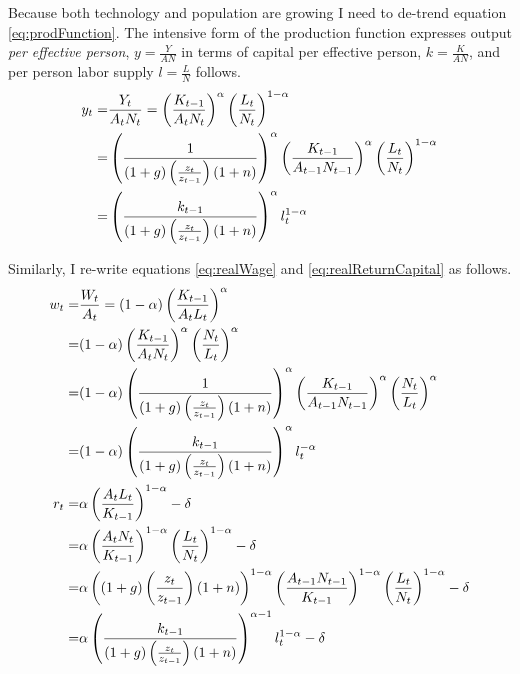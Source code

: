 \documentclass[11pt]{article}
\begin{document}
Because both technology and population are growing I need to de-trend equation \ref{eq:prodFunction}.  The intensive form of the production function expresses output \textit{per effective person}, $y=\frac{Y}{AN}$ in terms of capital per effective person, $k=\frac{K}{AN}$, and per person labor supply $l=\frac{L}{N}$ follows.
	\begin{align}
	         y_t =& \frac{Y_t}{A_t N_t} = \left(\frac{K_{t-1}}{A_t N_t}\right)^{\alpha}\left(\frac{L_{t}}{N_t}\right)^{1-\alpha} \notag \\
	         =&\left(\frac{1}{(1 + g)\left(\frac{z_t}{z_{t-1}}\right)(1 + n)}\right)^{\alpha}\left(\frac{K_{t-1}}{A_{t-1}N_{t-1}}\right)^\alpha \left(\frac{L_{t}}{N_{t}}\right)^{1-\alpha} \notag \\
	         =& \left(\frac{k_{t-1}}{(1 + g)\left(\frac{z_t}{z_{t-1}}\right)(1 + n)}\right)^{\alpha}l_t^{1 - \alpha}
	 \end{align}

Similarly, I re-write equations \ref{eq:realWage} and \ref{eq:realReturnCapital} as follows.
	\begin{align}
		w_{t} =& \frac{W_{t}}{A_{t}} = (1-\alpha)\left(\frac{K_{t-1}}{A_{t}L_{t}}\right)^\alpha \notag \\
		=& (1-\alpha)\left(\frac{K_{t-1}}{A_{t}N_{t}}\right)^\alpha \left(\frac{N_{t}}{L_{t}}\right)^{\alpha} \notag \\
		=& (1-\alpha)\left(\frac{1}{(1 + g)\left(\frac{z_t}{z_{t-1}}\right)(1 + n)}\right)^{\alpha}\left(\frac{K_{t-1}}{A_{t-1}N_{t-1}}\right)^\alpha \left(\frac{N_{t}}{L_{t}}\right)^{\alpha} \notag \\
		=& (1-\alpha)\left(\frac{k_{t-1}}{(1 + g)\left(\frac{z_t}{z_{t-1}}\right)(1 + n)}\right)^{\alpha} l_{t}^{-\alpha} \label{eq:inelastic-MPL} \\
		r_{t} =& \alpha\left(\frac{A_{t}L_{t}}{K_{t-1}}\right)^{1-\alpha} - \delta\notag \\
		=& \alpha\left(\frac{A_{t}N_{t}}{K_{t-1}}\right)^{1-\alpha} \left(\frac{L_{t}}{N_{t}}\right)^{1 - \alpha} - \delta\notag \\
		=& \alpha\left((1 + g)\left(\frac{z_t}{z_{t-1}}\right)(1 + n)\right)^{1-\alpha}\left(\frac{A_{t-1}N_{t-1}}{K_{t-1}}\right)^{1-\alpha} \left(\frac{L_{t}}{N_{t}}\right)^{1 - \alpha} - \delta\notag \\
		=& \alpha \left(\frac{k_{t-1}}{(1 + g)\left(\frac{z_t}{z_{t-1}}\right)(1 + n)}\right)^{\alpha-1} l_{t}^{1 - \alpha} - \delta  \label{eq:inelastic-MPK}
	\end{align}
	
\end{document}
